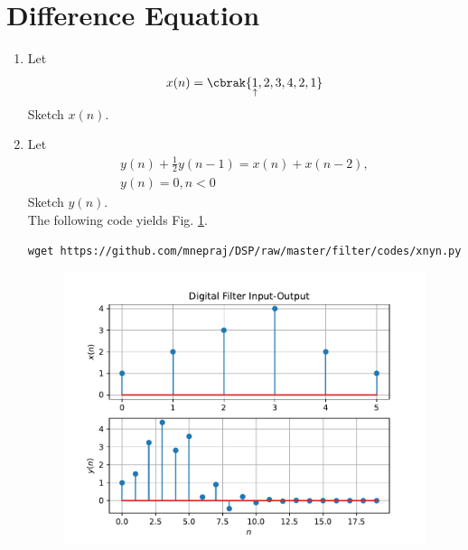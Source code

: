 \documentclass[journal,12pt,twocolumn]{IEEEtran}
\renewcommand\thesection{\arabic{section}}
\begin{document}
\section{Difference Equation}
\begin{enumerate}[label=\thesection.\arabic*,ref=\thesection.\theenumi]
	\item Let
	      \begin{equation}
		      x(n) = \cbrak{\underset{\uparrow}{1},2,3,4,2,1}
	      \end{equation}
	      Sketch $x(n)$.
	\item Let
	      \begin{multline}
		      \label{eq:iir_filter}
		      y(n) + \frac{1}{2}y(n-1) = x(n) + x(n-2),
		      \\
		      y(n) = 0, n < 0
	      \end{multline}
	      Sketch $y(n)$.
	      \\
	      \solution The following code yields Fig. \ref{fig:xnyn}.
	      \begin{lstlisting}
wget https://github.com/mnepraj/DSP/raw/master/filter/codes/xnyn.py
\end{lstlisting}
	      \begin{figure}[!ht]
		      \begin{center}
			      \includegraphics[width=\columnwidth]{./figs/xnyn}
		      \end{center}
		      \label{fig:xnyn}
	      \end{figure}

\end{enumerate}
\end{document}
